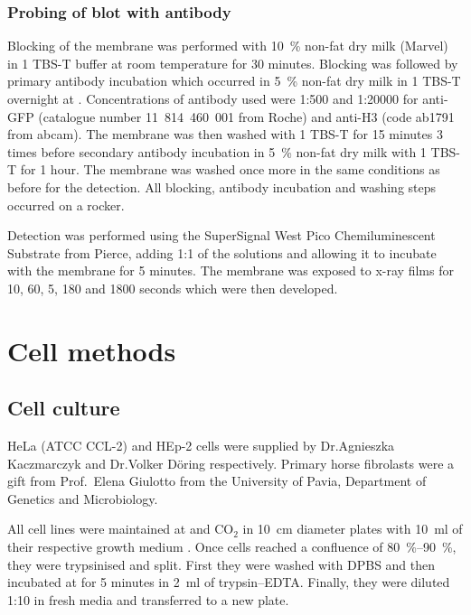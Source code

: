      \subsubsection{Probing of blot with antibody}
        Blocking of the membrane was performed with \SI{10}{\percent}
        non-fat dry milk (Marvel) in \SI{1}{\X} TBS-T buffer
        at room temperature for 30 minutes. Blocking was followed by
        primary antibody incubation which occurred in \SI{5}{\percent} non-fat
        dry milk in \SI{1}{\X} TBS-T overnight at . Concentrations of
        antibody used were 1:500 and 1:20000 for anti-GFP (catalogue
        number 11~814~460~001 from Roche) and anti-H3 (code ab1791 from
        abcam). The membrane was then washed with \SI{1}{\X} TBS-T for
        15 minutes 3 times before secondary antibody incubation
        in \SI{5}{\percent} non-fat dry milk with \SI{1}{\X} TBS-T for
        1 hour. The membrane was washed once more in the same
        conditions as before for the detection. All blocking, antibody
        incubation and washing steps occurred on a rocker.

        Detection was performed using the SuperSignal West Pico Chemiluminescent
        Substrate from Pierce, adding 1:1 of the solutions and allowing it to incubate
        with the membrane for 5 minutes. The membrane was exposed to x-ray films for
        10, 60, 5, 180 and 1800 seconds which were then developed.


  \section{Cell methods}
    \subsection{Cell culture}
      HeLa (ATCC CCL-2) and HEp-2 cells were supplied by
      Dr.\@ Agnieszka Kaczmarczyk \citep{AgaThesis}
      and Dr.\@ Volker Döring \citep{VolkerThesis} respectively.
      Primary horse fibrolasts were a gift from Prof.~Elena Giulotto from the
      University of Pavia, Department of Genetics and Microbiology.

      All cell lines were maintained at 
      and  CO$_2$ in \SI{10}{\cm}
      diameter plates with \SI{10}{\ml} of their respective growth
      medium .
      Once cells reached a confluence of \SIrange{80}{90}{\percent},
      they were trypsinised and split.  First they were washed with
      DPBS and then
      incubated at  for 5 minutes in \SI{2}{\ml} of
      trypsin--EDTA.  Finally, they were diluted 1:10 in fresh media
      and transferred to a new plate.

